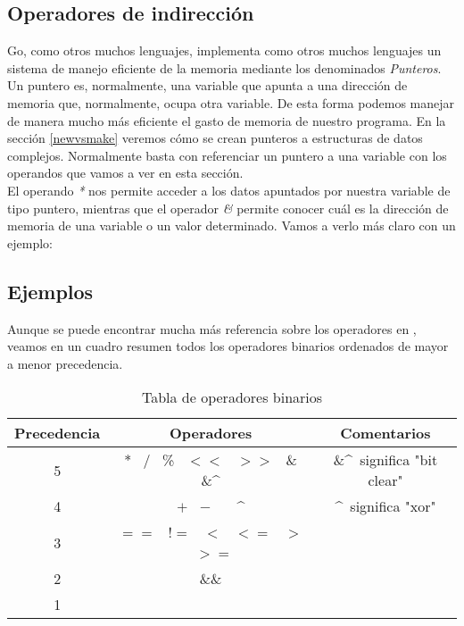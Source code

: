 	\subsection{Operadores de indirección}

	Go, como otros muchos lenguajes, implementa como otros muchos lenguajes un
	sistema de manejo eficiente de la memoria mediante los denominados
	\emph{Punteros}.\\

	Un puntero es, normalmente, una variable que apunta a una dirección de
	memoria que, normalmente, ocupa otra variable. De esta forma podemos manejar
	de manera mucho más eficiente el gasto de memoria de nuestro programa. En la
	sección \ref{newvsmake} veremos cómo se crean punteros a estructuras de
	datos complejos. Normalmente basta con referenciar un puntero a una variable
	con los operandos que vamos a ver en esta sección.\\

	El operando \emph{*} nos permite acceder a los datos apuntados por nuestra
	variable de tipo puntero, mientras que el operador \emph{\&} permite conocer
	cuál es la dirección de memoria de una variable o un valor determinado.
	Vamos a verlo más claro con un ejemplo:\\


	\subsection{Ejemplos}

	Aunque se puede encontrar mucha más referencia sobre los operadores en
	\cite{GoSpecOperators}, veamos en un cuadro resumen todos los operadores
	binarios ordenados de mayor a menor precedencia.

	\begin{table}[htb]
		\begin{center}
			\begin{tabular}{ccc}
				\textbf{Precedencia} & \textbf{Operadores} & \textbf{Comentarios}\\
				\hline
				5 & * \ / \ \% \ $<<$ \ $>>$ \ \& \&\textasciicircum & \&\textasciicircum\ significa "bit clear"\\
				4 & $+$ \ $-$ \ \textbar\ \ \textasciicircum & \textasciicircum\ significa "xor"\\
				3 & $==$ \ !$=$ \ $<$ \ $<=$ \ $>$ \ $>=$ & \\
				2 & \&\& & \\
				1 & \textbar\textbar & \\
			\end{tabular}
		\end{center}
		\caption{Tabla de operadores binarios}
	\end{table}

